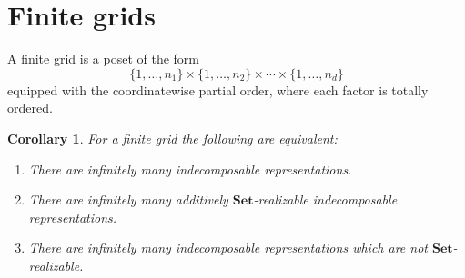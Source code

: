\documentclass[a4paper]{amsart}
\theoremstyle{plain}
\newtheorem{corollary}[theorem]{Corollary}
\theoremstyle{definition}
\theoremstyle{remark}
\newcommand{\Set}{\mathbf{Set}}
\begin{document}
\section{Finite grids}
\label{sec.finitegrids}

A finite grid is a poset of the form
\[ \{ 1, \ldots, n_1 \} \times \{ 1, \ldots, n_2 \} \times \cdots \times \{ 1, \ldots, n_d \} \]
equipped with the coordinatewise partial order, where each factor is totally ordered. 
\begin{corollary} \label{cor:finite_grods_of_infinite_type}
For a finite grid the following are equivalent:
\begin{enumerate}
\item There are infinitely many indecomposable representations.
\item There are infinitely many additively \( \Set \)-realizable indecomposable representations.
\item There are infinitely many indecomposable representations which are not \( \Set \)-realizable.
\end{enumerate}
\end{corollary}
\end{document}
